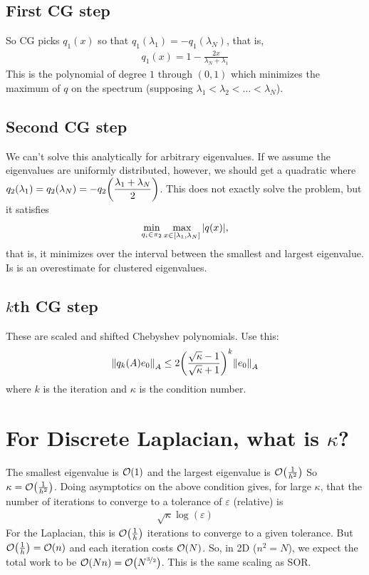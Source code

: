 \documentclass{article}
\newcommand{\E}{\varepsilon}
\begin{document}
        \subsection{First CG step}
            So CG picks $q_1(x)$ so that $q_1(\lambda_1) = -q_1(\lambda_N)$, that is,
            \begin{align*}
                q_1(x) = 1 - \frac{2x}{\lambda_N + \lambda_1}
            \end{align*}
            This is the polynomial of degree $1$ through $(0,1)$ which minimizes the maximum of $q$ on the spectrum (supposing $\lambda_1 < \lambda_2 < \dots < \lambda_N$).
        \subsection{Second CG step}
            We can't solve this analytically for arbitrary eigenvalues.  If we assume the eigenvalues are uniformly distributed, however, we should get a quadratic where $q_2(\lambda_1) = q_2(\lambda_N) = -q_2\qty(\dfrac{\lambda_1 + \lambda_N}{2})$.  This does not exactly solve the problem, but it satisfies
            \begin{align*}
                \min_{q_i\in\pi_2}\max_{x\in\qty[\lambda_1,\lambda_N]}\abs{q(x)},
            \end{align*}
            that is, it minimizes over the interval between the smallest and largest eigenvalue.  Is is an overestimate for clustered eigenvalues.
        \subsection{$k$th CG step}
            These are scaled and shifted Chebyshev polynomials.  Use this:
            \begin{align*}
                \norm{q_k(A)e_0}_A \leq 2\qty(\frac{\sqrt{\kappa}-1}{\sqrt{\kappa}+1})^k\norm{e_0}_A
            \end{align*}
            where $k$ is the iteration and $\kappa$ is the condition number.
    \section{For Discrete Laplacian, what is $\kappa$?}
        The smallest eigenvalue is $\order{1}$ and the largest eigenvalue is $\order{\frac{1}{h^2}}$  So $\kappa = \order{\frac{1}{h^2}}$.  Doing asymptotics on the above condition gives, for large $\kappa$, that the number of iterations to converge to a tolerance of $\E$ (relative) is
        \begin{align*}
            \sqrt{\kappa}\log(\E)
        \end{align*}
        For the Laplacian, this is $\order{\frac{1}{h}}$ iterations to converge to a given tolerance.  But $\order{\frac{1}{h}} = \order{n}$ and each iteration costs $\order{N}$.  So, in 2D ($n^2 = N$), we expect the total work to be $\order{Nn} = \order{N^{\nicefrac{3}{2}}}$.  This is the same scaling as SOR.
\end{document}

